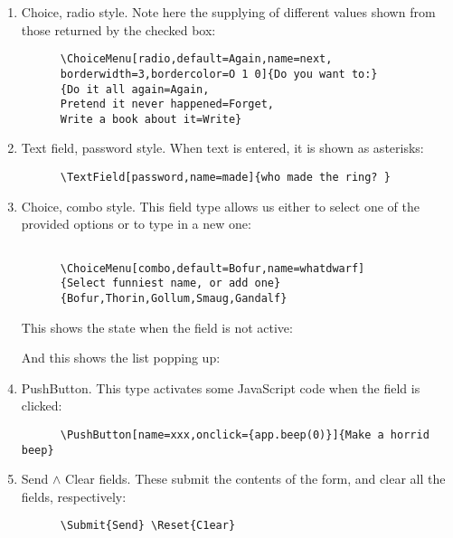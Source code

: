 \begin{enumerate}

    \item Choice, radio style. Note here the supplying of different values shown from 
      those returned by the checked box: 

      \begin{verbatim}
      \ChoiceMenu[radio,default=Again,name=next, 
      borderwidth=3,bordercolor=O 1 0]{Do you want to:} 
      {Do it all again=Again, 
      Pretend it never happened=Forget, 
      Write a book about it=Write} 
      \end{verbatim}

    \item Text field, password style. When text is entered, it is shown as asterisks: 

      \begin{verbatim}
      \TextField[password,name=made]{who made the ring? } 
      \end{verbatim}


    \item Choice, combo style. This field type allows us either to select one of the provided options or to type in a new one: 

      \begin{verbatim}

      \ChoiceMenu[combo,default=Bofur,name=whatdwarf] 
      {Select funniest name, or add one} 
      {Bofur,Thorin,Gollum,Smaug,Gandalf} 

      \end{verbatim}

      This shows the state when the field is not active: 

      And this shows the list popping up: 

    \item PushButton. This type activates some JavaScript code when the field is clicked: 

      \begin{verbatim}
      \PushButton[name=xxx,onclick={app.beep(0)}]{Make a horrid beep} 
      \end{verbatim}

    \item Send $\wedge$ Clear fields. These submit the contents of the form, and clear all the 
      fields, respectively: 

      \begin{verbatim}
      \Submit{Send} \Reset{C1ear} 
      \end{verbatim}

  \end{enumerate}

